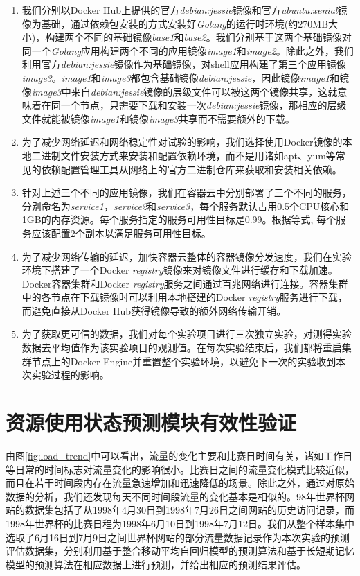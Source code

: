\begin{enumerate}
\begin{figure}[htbp]
\end{figure}
\item\label{req:serv_image} 我们分别以Docker Hub上提供的官方\emph{debian:jessie}镜像和官方\emph{ubuntu:xenial}镜像为基础，通过依赖包安装的方式安装好\emph{Golang}的运行时环境(约270MB大小)，构建两个不同的基础镜像\emph{base1}和\emph{base2}。我们分别基于这两个基础镜像对同一个\emph{Golang}应用构建两个不同的应用镜像\emph{image1}和\emph{image2}。除此之外，我们利用官方\emph{debian:jessie}镜像作为基础镜像，对shell应用构建了第三个应用镜像\emph{image3}。\emph{image1}和\emph{image3}都包含基础镜像\emph{debian:jessie}，因此镜像\emph{image1}和镜像\emph{image3}中来自\emph{debian:jessie}镜像的层级文件可以被这两个镜像共享，这就意味着在同一个节点，只需要下载和安装一次\emph{debian:jessie}镜像，那相应的层级文件就能被镜像\emph{image1}和镜像\emph{image3}共享而不需要额外的下载。
\item 为了减少网络延迟和网络稳定性对试验的影响，我们选择使用Docker镜像的本地二进制文件安装方式来安装和配置依赖环境，而不是用诸如apt、yum等常见的依赖配置管理工具从网络上的官方二进制仓库来获取和安装相关依赖。
\item\label{req:serv_aval} 针对上述三个不同的应用镜像，我们在容器云中分别部署了三个不同的服务，分别命名为\emph{service1}，\emph{service2}和\emph{service3}，每个服务默认占用0.5个CPU核心和1GB的内存资源。每个服务指定的服务可用性目标是0.99。根据等式, 每个服务应该配置2个副本以满足服务可用性目标。
\item\label{req:registry_mirror} 为了减少网络传输的延迟，加快容器云整体的容器镜像分发速度，我们在实验环境下搭建了一个Docker \emph{registry}镜像来对镜像文件进行缓存和下载加速。Docker容器集群和Docker \emph{registry}服务之间通过百兆网络进行连接。容器集群中的各节点在下载镜像时可以利用本地搭建的Docker \emph{registry}服务进行下载，而避免直接从Docker Hub获得镜像导致的额外网络传输开销。
\item 为了获取更可信的数据，我们对每个实验项目进行三次独立实验，对测得实验数据去平均值作为该实验项目的观测值。在每次实验结束后，我们都将重启集群节点上的Docker Engine并重置整个实验环境，以避免下一次的实验收到本次实验过程的影响。
\end{enumerate}

\section{资源使用状态预测模块有效性验证}
由图\ref{fig:load_trend}中可以看出，流量的变化主要和比赛日时间有关，诸如工作日等日常的时间标志对流量变化的影响很小。比赛日之间的流量变化模式比较近似，而且在若干时间段内存在流量急速增加和迅速降低的场景。除此之外，通过对原始数据的分析，我们还发现每天不同时间段流量的变化基本是相似的。98年世界杯网站的数据集包括了从1998年4月30日到1998年7月26日之间网站的历史访问记录，而1998年世界杯的比赛日程为1998年6月10日到1998年7月12日。我们从整个样本集中选取了6月16日到7月9日之间世界杯网站的部分流量数据记录作为本次实验的预测评估数据集，分别利用基于整合移动平均自回归模型的预测算法和基于长短期记忆模型的预测算法在相应数据上进行预测，并给出相应的预测结果评估。

